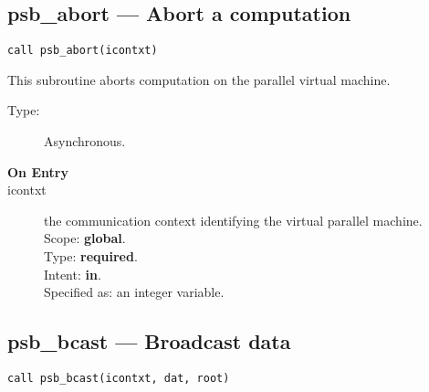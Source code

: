 \clearpage\subsection*{psb\_abort --- Abort a computation}

\begin{verbatim}
call psb_abort(icontxt)
\end{verbatim}

This subroutine aborts computation on the parallel virtual machine. 
\begin{description}
\item[Type:] Asynchronous.
\item[\bf  On Entry ]
\item[icontxt] the communication context identifying the virtual
  parallel machine.\\
Scope: {\bf global}.\\
Type: {\bf required}.\\
Intent: {\bf in}.\\
Specified as: an integer variable.
\end{description}





\clearpage\subsection*{psb\_bcast --- Broadcast data}

\begin{verbatim}
call psb_bcast(icontxt, dat, root)
\end{verbatim}

